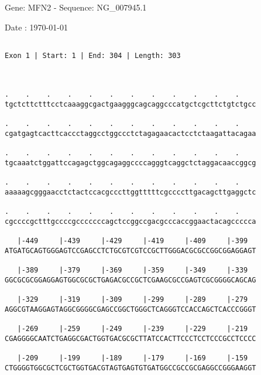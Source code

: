 \documentclass{article}
\begin{document}
\begin{center}
\begin{large}
 Gene: MFN2 - Sequence: NG\_007945.1
 
 Date : \today
\end{large}
\end{center}
 \begin{Verbatim}
 
Exon 1 | Start: 1 | End: 304 | Length: 303



.    .    .    .    .    .    .    .    .    .    .    .    
tgctcttctttcctcaaaggcgactgaagggcagcaggcccatgctcgcttctgtctgcc
                                                            
.    .    .    .    .    .    .    .    .    .    .    .    
cgatgagtcacttcaccctaggcctggccctctagagaacactcctctaagattacagaa
                                                            
.    .    .    .    .    .    .    .    .    .    .    .    
tgcaaatctggattccagagctggcagaggccccagggtcaggctctaggacaaccggcg
                                                            
.    .    .    .    .    .    .    .    .    .    .    .    
aaaaagcgggaacctctactccacgcccttggtttttcgccccttgacagcttgaggctc
                                                            
.    .    .    .    .    .    .    .    .    .    .    .    
cgccccgctttgccccgcccccccagctccggccgacgcccaccggaactacagccccca
                                                            
   |-449     |-439     |-429     |-419     |-409     |-399  
ATGATGCAGTGGGAGTCCGAGCCTCTGCGTCGTCCGCTTGGGACGCGCCGGCGGAGGAGT
                                                            
   |-389     |-379     |-369     |-359     |-349     |-339  
GGCGCGCGGAGGAGTGGCGCGCTGAGACGCCGCTCGAAGCGCCGAGTCGCGGGGCAGCAG
                                                            
   |-329     |-319     |-309     |-299     |-289     |-279  
AGGCGTAAGGAGTAGGCGGGGCGAGCCGGCTGGGCTCAGGGTCCACCAGCTCACCCGGGT
                                                            
   |-269     |-259     |-249     |-239     |-229     |-219  
CGAGGGGCAATCTGAGGCGACTGGTGACGCGCTTATCCACTTCCCTCCTCCCGCCTCCCC
                                                            
   |-209     |-199     |-189     |-179     |-169     |-159  
CTGGGGTGGCGCTCGCTGGTGACGTAGTGAGTGTGATGGCCGCCGCGAGGCCGGGAAGGT
                                                            

\end{Verbatim}
\end{document}
